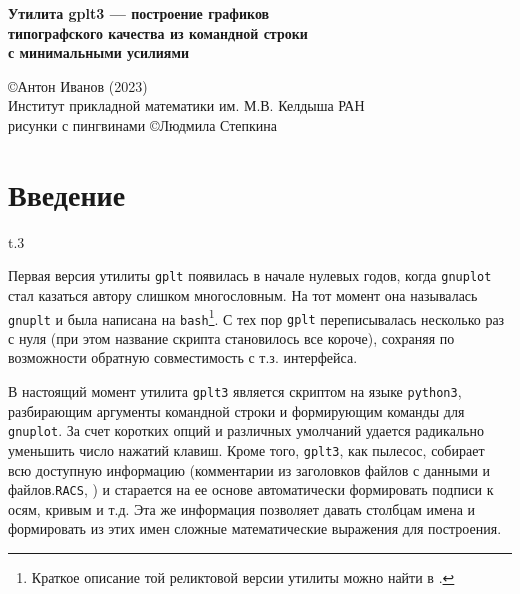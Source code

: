 \documentclass[12pt]{article}
\def\gplt{{\tt gplt}}
\def\gnuplot{{\tt gnuplot}}
\def\python{{\tt python3}}
\def\RACS{{\tt RACS}}
\begin{document}
\begin{center}
 { \Large\bf
Утилита gplt3 --- построение графиков\\ типографского качества из командной строки\\ с минимальными усилиями\\[5mm]
}

\large
\copyright Антон Иванов (2023)\\[2mm]
\normalsize
Институт прикладной математики им. М.В. Келдыша РАН\\[2mm]

\small рисунки с пингвинами \copyright Людмила Степкина 
\vfill


\vfill
\end{center}

\tableofcontents

\newpage
\section{Введение}
\begin{wrapfigure}[5]{t}{.3\textwidth}
  \vphantom{.}
  \vspace{-1.5cm}

\end{wrapfigure}
Первая версия утилиты \gplt{} появилась в начале нулевых годов, когда \gnuplot{} стал казаться автору слишком многословным.
На тот момент она называлась \verb'gnuplt' и была написана на \verb'bash'\footnote{Краткое описание той реликтовой версии утилиты можно найти в \cite{aiv:racs2007}.}.
С тех пор \gplt{} переписывалась несколько раз с нуля (при этом название скрипта становилось все короче),
сохраняя по возможности обратную совместимость с т.з. интерфейса.  

\def\gplt{{\tt gplt3}}

В настоящий момент утилита \gplt{} является скриптом на языке \python, разбирающим аргументы командной строки и формирующим команды для \gnuplot.
За счет коротких опций и различных умолчаний удается радикально уменьшить число нажатий клавиш. Кроме того, \gplt{}, как пылесос, собирает всю доступную информацию
(комментарии из заголовков файлов с данными и файлов.\RACS, \cite{aiwlib:SR:PP2018})
и старается на ее основе автоматически формировать подписи к осям, кривым и т.д.
Эта же информация позволяет давать столбцам имена и формировать из этих имен сложные математические выражения для построения.
\end{document}
